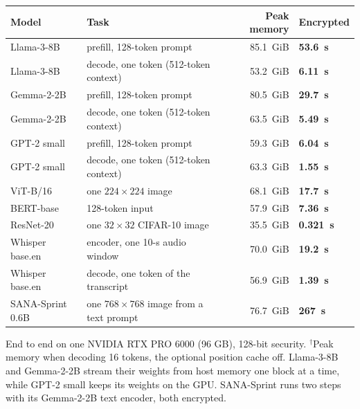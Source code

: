 \documentclass[border={14pt 4pt 14pt 4pt},varwidth=17.2cm,multi=tbl]{standalone}
\newcommand{\llamapf}{53.6}\newcommand{\llamadec}{6.11}\newcommand{\gptpf}{6.04}\newcommand{\gptdec}{1.55}
\newcommand{\vitimg}{17.7}\newcommand{\bertin}{7.36}
\newcommand{\resnetimg}{0.321}\newcommand{\resnetmem}{35.5}\newcommand{\resnettop}{92.5}
\newcommand{\gemmapf}{29.7}\newcommand{\gemmadec}{5.49}\newcommand{\gemmapfmem}{80.5}\newcommand{\gemmadecmem}{63.5}
\newcommand{\sanaimg}{267}\newcommand{\sanamem}{76.7}
\newcommand{\whisperenc}{19.2}\newcommand{\whisperdec}{1.39}\newcommand{\whisperencmem}{70.0}\newcommand{\whisperdecmem}{56.9}
\newcommand{\llamapfmem}{85.1}\newcommand{\llamadecmem}{53.2}\newcommand{\gptpfmem}{59.3}\newcommand{\gptdecmem}{63.3}
\newcommand{\vitmem}{68.1}\newcommand{\bertmem}{57.9}
\newcommand{\nt}[1]{\rlap{$^{#1}$}}
\newcommand{\tcap}[1]{\par\vspace{6pt}\begin{minipage}{\linewidth}\fontsize{11.5}{14.5}\selectfont #1\end{minipage}}
\newenvironment{tbl}{\centering\setlength{\tabcolsep}{7pt}\renewcommand{\arraystretch}{1.18}}{}
\begin{document}
\begin{tbl}
\renewcommand{\arraystretch}{1.3}\setlength{\aboverulesep}{0pt}\setlength{\belowrulesep}{0pt}\setlength{\extrarowheight}{2pt}
\begin{tabularx}{\linewidth}{lL{1}rP}
\toprule
\textbf{Model} & \textbf{Task} & \textbf{Peak memory} & \textbf{Encrypted} \\
\midrule
Llama-3-8B & prefill, 128-token prompt & \llamapfmem\ GiB & \textbf{\llamapf\ s} \\
Llama-3-8B & decode, one token (512-token context) & \llamadecmem\ GiB\nt{\dagger} & \textbf{\llamadec\ s} \\
Gemma-2-2B & prefill, 128-token prompt & \gemmapfmem\ GiB & \textbf{\gemmapf\ s} \\
Gemma-2-2B & decode, one token (512-token context) & \gemmadecmem\ GiB\nt{\dagger} & \textbf{\gemmadec\ s} \\
GPT-2 small & prefill, 128-token prompt & \gptpfmem\ GiB & \textbf{\gptpf\ s} \\
GPT-2 small & decode, one token (512-token context) & \gptdecmem\ GiB\nt{\dagger} & \textbf{\gptdec\ s} \\
ViT-B/16 & one $224\times224$ image & \vitmem\ GiB & \textbf{\vitimg\ s} \\
BERT-base & 128-token input & \bertmem\ GiB & \textbf{\bertin\ s} \\
ResNet-20 & one $32\times32$ CIFAR-10 image & \resnetmem\ GiB & \textbf{\resnetimg\ s} \\
Whisper base.en & encoder, one 10-s audio window & \whisperencmem\ GiB & \textbf{\whisperenc\ s} \\
Whisper base.en & decode, one token of the transcript & \whisperdecmem\ GiB & \textbf{\whisperdec\ s} \\
SANA-Sprint 0.6B & one $768\times768$ image from a text prompt & \sanamem\ GiB & \textbf{\sanaimg\ s} \\
\bottomrule
\end{tabularx}
\tcap{End to end on one NVIDIA RTX PRO 6000 (96 GB), 128-bit security. $^\dagger$Peak memory when decoding 16 tokens, the optional position cache off.
Llama-3-8B and Gemma-2-2B stream their weights from host memory one block at a time, while GPT-2 small keeps its weights
on the GPU. SANA-Sprint runs two steps with its Gemma-2-2B text encoder, both encrypted.}
\end{tbl}
\end{document}
